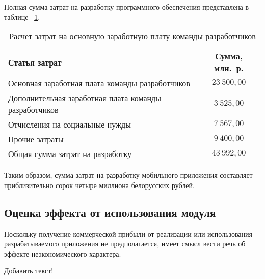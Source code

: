 Полная сумма затрат на разработку программного обеспечения представлена в таблице
~\ref{tbl:teo_sum_cost}.

\begin{table} [h!]
  \caption{
    Расчет затрат на основную заработную плату команды разработчиков
  }\label{tbl:teo_sum_cost}
  \begin{tabular}{| m{13.5cm} | c |}
    \hline

    \parbox{13.5cm}{
    \smallskip
    \centering Статья затрат
    \smallskip
    }
    &
      \parbox{2cm}{
      \smallskip
      \centering Сумма, млн.~р.
    \smallskip
    } \\
    \hline

    Основная заработная плата команды разработчиков
    & \( 23 \: 500{,}00 \)\\
    \hline

    Дополнительная заработная плата команды разработчиков
    & \( 3 \: 525{,}00 \)\\
    \hline

    Отчисления на социальные нужды
    & \( 7 \: 567{,}00 \)\\
    \hline

    Прочие затраты
    & \( 9 \: 400{,}00 \)\\
    \hline

    Общая сумма затрат на разработку
    & \( 43 \: 992{,}00 \) \\
    \hline
  \end{tabular}
\end{table}

Таким образом, сумма затрат на разработку мобильного приложения
составляет приблизительно сорок четыре миллиона белорусских рублей.

\subsection{Оценка эффекта от использования модуля}

Поскольку получение коммерческой прибыли от реализации или использования
разрабатываемого приложения не предполагается, имеет смысл вести речь об
эффекте неэкономического характера.

{\color{red} Добавить текст! }